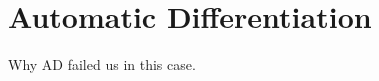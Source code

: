\documentclass[Thesis.tex]{subfiles}
\begin{document}
\chapter{Automatic Differentiation}
\label{chp:auto-diff}

Why AD failed us in this case.
\end{document}
